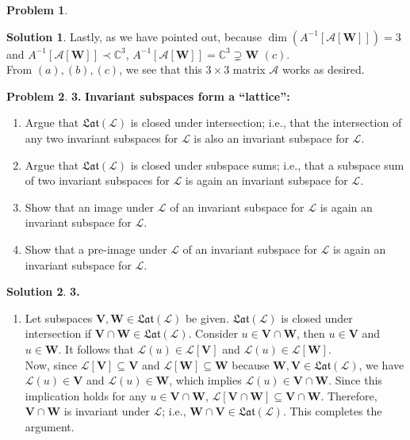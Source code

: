 \documentclass{article}
\theoremstyle{definition}
\newtheorem*{prob*}{Problem}
\newtheorem*{sln*}{Solution}
\newcommand{\V}{\mathbf{V}}
\newcommand{\W}{\mathbf{W}}
\newcommand{\lag}{\mathcal{L}}
\begin{document}
\begin{prob*}
\begin{sln*}
		\noindent Lastly, as we have pointed out, because    $\dim\left(A^{-1}\left[\mathcal{A}[\W]\right]\right) = 3$ and $A^{-1}\left[\mathcal{A}[\W]\right] \prec \mathbb{C}^3$, $A^{-1}\left[\mathcal{A}[\W]\right] = \mathbb{C}^3 \supsetneq \W$ $(c)$.\\
		
		\noindent From $(a),(b),(c)$, we see that this $3\times 3$ matrix $\mathcal{A}$ works as desired.   
	\end{sln*}
	
	
\end{prob*}









\newpage

\begin{prob*}\textbf{3.}
	\textbf{Invariant subspaces form a ``lattice'':}
	\begin{enumerate}
		\item Argue that $\mathfrak{Lat}(\lag)$ is closed under intersection; i.e., that the intersection of any two invariant subspaces for $\lag$ is also an invariant subspace for $\lag$.
		\item Argue that $\mathfrak{Lat}(\lag)$ is closed under subspace sums; i.e., that a subspace sum of two invariant subspaces for $\lag$ is again an invariant subspace for $\lag$.
		\item Show that an image under $\lag$ of an invariant subspace for $\lag$ is again an invariant subspace for $\lag$.
		\item Show that a pre-image under $\lag$ of an invariant subspace for $\lag$ is again an invariant subspace for $\lag$. 
	\end{enumerate}
	
	
	\begin{sln*}\textbf{3.}
		$\,$
		\begin{enumerate}
			\item Let subspaces $\V, \W \in \mathfrak{Lat}(\lag)$ be given. $\mathfrak{Lat}(\lag)$ is closed under intersection if $\V \cap \W \in \mathfrak{Lat}(\lag)$. Consider $u\in \V\cap\W$, then $u\in\V$ and $u\in\W$. It follows that $\lag(u)\in \lag[\V]$ and $\lag(u)\in \lag[\W]$.\\
			
			Now, since $\lag[\V]\subseteq \V$ and $\lag[\W]\subseteq \W$ because $\W,\V \in \mathfrak{Lat}(\lag)$, we have $\lag(u)\in\V$ and $\lag(u)\in \W$, which implies $\lag(u)\in \V\cap \W$. Since this implication holds for any $u\in \V\cap\W$, $\lag[\V\cap\W]\subseteq \V\cap\W$. Therefore, $\V\cap\W$ is invariant under $\lag$; i.e., $\W\cap\V \in \mathfrak{Lat}(\lag)$. This completes the argument. \\
			

\end{enumerate}
\end{sln*}
\end{prob*}
\end{document}

